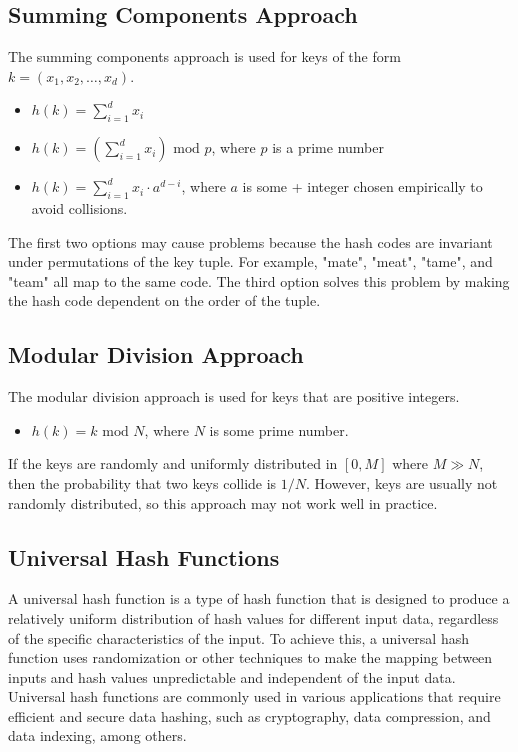 \documentclass[12pt]{article}
\newcommand{\1}{\space \quad}
\newcommand{\2}{\quad \quad \quad}
\newcommand{\3}{\quad \quad \quad \quad \space}
\newcommand{\4}{\quad \quad \quad \quad \quad \quad}
\begin{document}
\subsection{Summing Components Approach}
The summing components approach is used for keys of the form $k = (x_1, x_2, \ldots, x_d)$.
\begin{itemize}
\item $h(k) = \sum\limits_{i=1}^{d} x_i$
\item $h(k) = (\sum\limits_{i=1}^{d} x_i) \text{ mod } p$, where $p$ is a prime number
\item $h(k) = \sum\limits_{i=1}^{d} x_i \cdot a^{d-i}$, where $a$ is some + integer chosen empirically to avoid collisions.
\end{itemize}
The first two options may cause problems because the hash codes are invariant under permutations of the key tuple. For example, 
"mate", "meat", "tame", and "team" all map to the same code. The third option solves this problem by making the hash code 
dependent on the order of the tuple.

\subsection{Modular Division Approach}
The modular division approach is used for keys that are positive integers.
\begin{itemize}
\item $h(k) = k \text{ mod } N$, where $N$ is some prime number.
\end{itemize}
If the keys are randomly and uniformly distributed in $[0, M]$ where $M \gg N$, then the probability that two keys collide 
is $1/N$. However, keys are usually not randomly distributed, so this approach may not work well in practice.
\subsection{Universal Hash Functions}
A universal hash function is a type of hash function that is designed to produce a relatively uniform distribution of hash 
values for different input data, regardless of the specific characteristics of the input. To achieve this, a universal hash 
function uses randomization or other techniques to make the mapping between inputs and hash values unpredictable and 
independent of the input data. Universal hash functions are commonly used in various applications that require efficient 
and secure data hashing, such as cryptography, data compression, and data indexing, among others.
\end{document}
